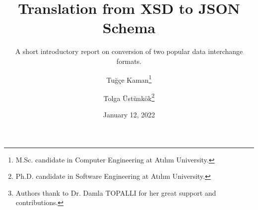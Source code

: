 \documentclass[paper=a4,oneside,fontsize=12,parskip=full,titlepage=firstiscover,toc=sectionentrywithdots]{scrartcl}
\begin{document}
    \titlehead{Atılım University\\Department of Computer Engineering}
    \title{Translation from XSD to JSON Schema}
    \subtitle{A short introductory report on conversion of two popular data interchange formats.}
    \author{Tuğçe Kaman\thanks{M.Sc. candidate in Computer Engineering at Atılım University.} \and Tolga Üstünkök\thanks{Ph.D. candidate in Software Engineering at Atılım University.}}
    \date{January 12, 2022}
    \publishers{CMPE541 - Advanced Databases\thanks{Authors thank to Dr. Damla TOPALLI for her great support and contributions.}}
    \maketitle
    \tableofcontents\newpage

    
    
    
    

    \printbibliography[heading=bibintoc]
\end{document}
